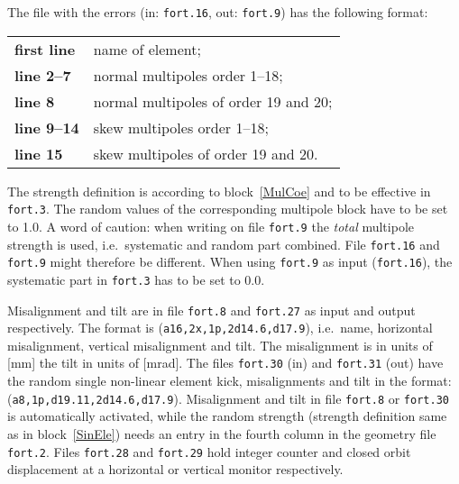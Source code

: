 The file with the errors (in: \texttt{fort.16}, out: \texttt{fort.9}) has the following format:

\bigskip
\begin{tabular}{ll}
    \textbf{first line} & name of element; \\
    \textbf{line 2--7}  & normal multipoles order 1--18; \\
    \textbf{line 8}     & normal multipoles of order 19 and 20; \\
    \textbf{line 9--14} & skew multipoles order 1--18; \\
    \textbf{line 15}    & skew multipoles of order 19 and 20.
\end{tabular}

\bigskip
The strength definition is according to block~\ref{MulCoe} and to be effective in \texttt{fort.3}.
The random values of the corresponding multipole block have to be set to 1.0.
A word of caution: when writing on file \texttt{fort.9} the \textit{total} multipole strength is used, i.e.\ systematic and random part combined.
File \texttt{fort.16} and \texttt{fort.9} might therefore be different.
When using \texttt{fort.9} as input (\texttt{fort.16}), the systematic part in \texttt{fort.3} has to be set to 0.0.

Misalignment and tilt are in file \texttt{fort.8} and \texttt{fort.27} as input and output respectively.
The format is (\texttt{a16,2x,1p,2d14.6,d17.9}), i.e.\ name, horizontal misalignment, vertical misalignment and tilt.
The misalignment is in units of [mm] the tilt in units of [mrad].
The files \texttt{fort.30} (in) and \texttt{fort.31} (out) have the random single non-linear element kick, misalignments and tilt in the format: (\texttt{a8,1p,d19.11,2d14.6,d17.9}).
Misalignment and tilt in file \texttt{fort.8} or \texttt{fort.30} is automatically activated, while the random strength (strength definition same as in block~\ref{SinEle}) needs an entry in the fourth column in the geometry file \texttt{fort.2}.
Files \texttt{fort.28} and \texttt{fort.29} hold integer counter and closed orbit displacement at a horizontal or vertical monitor respectively.

 \setcounter{dst}{0}

